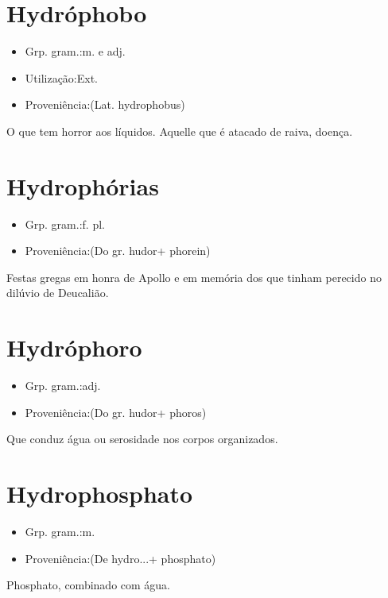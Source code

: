 \documentclass{article}
\begin{document}
\section{Hydróphobo}
\begin{itemize}
\item {Grp. gram.:m.  e  adj.}
\end{itemize}
\begin{itemize}
\item {Utilização:Ext.}
\end{itemize}
\begin{itemize}
\item {Proveniência:(Lat. \textunderscore hydrophobus\textunderscore )}
\end{itemize}
O que tem horror aos líquidos.
Aquelle que é atacado de raiva, doença.
\section{Hydrophórias}
\begin{itemize}
\item {Grp. gram.:f. pl.}
\end{itemize}
\begin{itemize}
\item {Proveniência:(Do gr. \textunderscore hudor\textunderscore  + \textunderscore phorein\textunderscore )}
\end{itemize}
Festas gregas em honra de Apollo e em memória dos que tinham perecido no dilúvio de Deucalião.
\section{Hydróphoro}
\begin{itemize}
\item {Grp. gram.:adj.}
\end{itemize}
\begin{itemize}
\item {Proveniência:(Do gr. \textunderscore hudor\textunderscore  + \textunderscore phoros\textunderscore )}
\end{itemize}
Que conduz água ou serosidade nos corpos organizados.
\section{Hydrophosphato}
\begin{itemize}
\item {Grp. gram.:m.}
\end{itemize}
\begin{itemize}
\item {Proveniência:(De \textunderscore hydro...\textunderscore  + \textunderscore phosphato\textunderscore )}
\end{itemize}
Phosphato, combinado com água.
\end{document}
